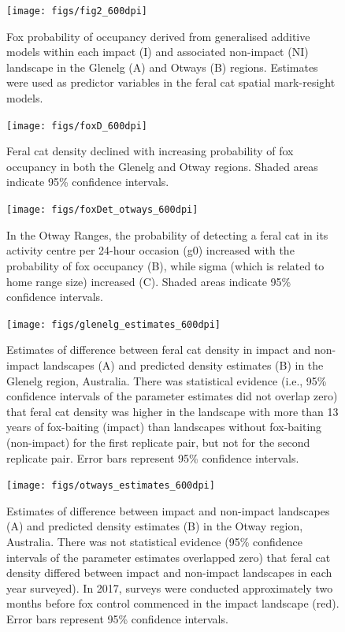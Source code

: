 \documentclass[]{elsarticle} %
\begin{document}
\newpage

\begin{figure}
\texttt{[image: figs/fig2\_600dpi]} \caption{Fox probability of occupancy derived from generalised additive models within each impact (I) and associated non-impact (NI) landscape in the Glenelg (A) and Otways (B) regions. Estimates were used as predictor variables in the feral cat spatial mark-resight models.}\label{fig:foxplot}
\end{figure}

\newpage

\begin{figure}
\texttt{[image: figs/foxD\_600dpi]} \caption{Feral cat density declined with increasing probability of fox occupancy in both the Glenelg and Otway regions. Shaded areas indicate 95\% confidence intervals.}\label{fig:dcor}
\end{figure}

\newpage

\begin{figure}
\texttt{[image: figs/foxDet\_otways\_600dpi]} \caption{In the Otway Ranges, the probability of detecting a feral cat in its activity centre per 24-hour occasion (g0) increased with the probability of fox occupancy (B), while sigma (which is related to home range size) increased (C). Shaded areas indicate 95\% confidence intervals.}\label{fig:detcor}
\end{figure}

\newpage

\begin{figure}
\texttt{[image: figs/glenelg\_estimates\_600dpi]} \caption{Estimates of difference between feral cat density in impact and non-impact landscapes (A) and predicted density estimates (B) in the Glenelg region, Australia. There was statistical evidence (i.e., 95\% confidence intervals of the parameter estimates did not overlap zero) that feral cat density was higher in the landscape with more than 13 years of fox-baiting (impact) than landscapes without fox-baiting (non-impact) for the first replicate pair, but not for the second replicate pair. Error bars represent 95\% confidence intervals.}\label{fig:diffg}
\end{figure}

\newpage

\begin{figure}
\texttt{[image: figs/otways\_estimates\_600dpi]} \caption{Estimates of difference between impact and non-impact landscapes (A) and predicted density estimates (B) in the Otway region, Australia. There was not statistical evidence (95\% confidence intervals of the parameter estimates overlapped zero) that feral cat density differed between impact and non-impact landscapes in each year surveyed). In 2017, surveys were conducted approximately two months before fox control commenced in the impact landscape (red). Error bars represent 95\% confidence intervals.}\label{fig:diffo}
\end{figure}
\end{document}
